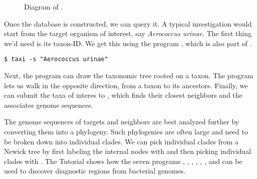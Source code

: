 \begin{figure}
  \begin{center}
    
  \end{center}
  \caption{Diagram of .}\label{fig:db}
\end{figure}

Once the database is constructed, we can query it. A typical
investigation would start from the target organism of interest,
say \emph{Aerococcus urinae}. The first thing we'd need is its
taxon-ID. We get this using the program , which is also part
of .
\begin{verbatim}
$ taxi -s "Aerococcus urinae"
\end{verbatim}
Next, the program  can draw the taxonomic tree rooted on a
taxon. The program  lets us walk in the opposite direction,
from a taxon to its ancestors. Finally, we can submit the taxa of
interes to , which finds their closest neighbors and the
associates genome sequences. 

The genome sequences of targets and neighbors are best analyzed
further by converting them into a phylogeny. Such phylogenies are
often large and need to be broken down into individual clades. We can
pick individual clades from a Newick tree by first labeling the
internal nodes with  and then picking individual clades
with . The Tutorial shows how the seven
programs , , , ,
, , and  can be used to discover
diagnostic regions from bacterial genomes.
